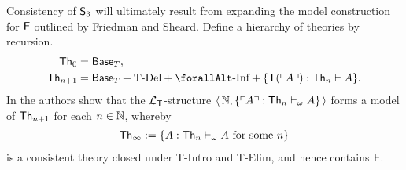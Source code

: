 \documentclass[UKenglish,cleveref,DIV=12]{scrartcl}
\let\forall\forallAlt
\newtheorem{theorem}{Theorem}
\theoremstyle{definition}
\theoremstyle{definition}
\begin{document}
Consistency of $\mathsf{S}_3$ will ultimately result from expanding the model
construction for $\mathsf{F}$ outlined by Friedman and Sheard.
Define a hierarchy of theories by recursion.
\begin{align*}
 \Th_0&=\BaseT,\\
 \Th_{n+1}&=\BaseT+\text{T-Del}+\text{$\forall$-Inf}+\{\T(\gn A):\Th_n\proves A\}.
\end{align*}
In \cite[\S3]{FS87} the authors show that the $\mathcal{L}_{\mathsf{T}}$-structure $\langle\,\mathbb N,\{\ulcorner{A}\urcorner:\mathsf{Th}_n\vdash_\omega A\}\,\rangle$
forms a model of $\mathsf{Th}_{n+1}$ for each $n\in\mathbb N$, whereby
\begin{align*}
  \mathsf{Th}_\infty:=\{A:\text{$\mathsf{Th}_n\vdash_\omega A$ for some $n$}\}
\end{align*}
is a
consistent theory closed under T-Intro and T-Elim, and hence contains $\mathsf{F}$.
\end{document}
